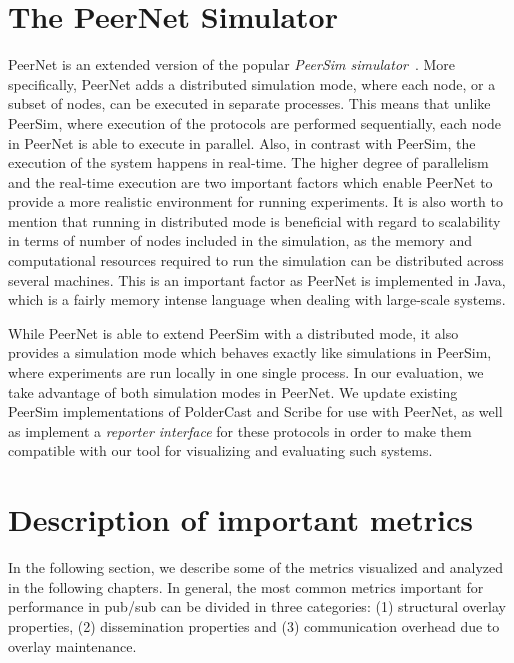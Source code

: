 \section{The PeerNet Simulator}
PeerNet is an extended version of the
popular \emph{PeerSim simulator}~\cite{p2p09-peersim}. More
specifically, PeerNet adds a distributed simulation mode, where each
node, or a subset of nodes, can be executed in separate processes. This
means that unlike PeerSim, where execution of the protocols are
performed sequentially, each node in PeerNet is able to execute
in parallel. Also, in contrast with PeerSim, the execution of the
system happens in real-time. The higher degree of parallelism and
the real-time execution are two important factors which enable PeerNet to
provide a more realistic environment for running experiments. It is also
worth to mention that running in distributed mode is beneficial with
regard to scalability in terms of number of nodes included in the
simulation, as the memory and computational resources required to run
the simulation can be distributed across several machines. This is an
important factor as PeerNet is implemented in Java, which is a fairly
memory intense language when dealing with large-scale systems.

While PeerNet is able to extend PeerSim with a distributed mode, it also
provides a simulation mode which behaves exactly like simulations in
PeerSim, where experiments are run locally in one single process. In our
evaluation, we take advantage of both simulation modes in PeerNet. We
update existing PeerSim implementations of PolderCast and Scribe for use
with PeerNet, as well as implement a \emph{reporter interface} for these
protocols in order to make them compatible with our tool for visualizing
and evaluating such systems.

\section{Description of important metrics}

In the following section, we describe some of the metrics visualized and
analyzed in the following chapters. In general, the most common metrics
important for performance in pub/sub can be divided in three categories:
(1) structural overlay properties, (2) dissemination properties and (3)
communication overhead due to overlay maintenance.


